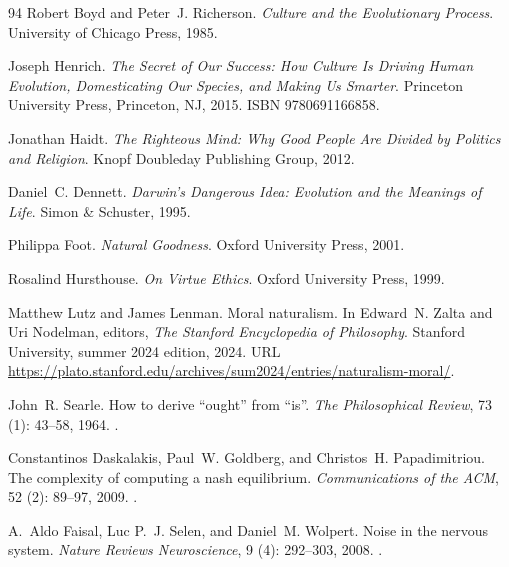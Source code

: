 \documentclass[11pt]{article}
\theoremstyle{plain}
\theoremstyle{definition}
\theoremstyle{remark}
\begin{document}
\begin{thebibliography}{94}
Robert Boyd and Peter~J. Richerson.
\newblock \emph{Culture and the Evolutionary Process}.
\newblock University of Chicago Press, 1985.

Joseph Henrich.
\newblock \emph{The Secret of Our Success: How Culture Is Driving Human
  Evolution, Domesticating Our Species, and Making Us Smarter}.
\newblock Princeton University Press, Princeton, NJ, 2015.
\newblock ISBN 9780691166858.

Jonathan Haidt.
\newblock \emph{The Righteous Mind: Why Good People Are Divided by Politics and
  Religion}.
\newblock Knopf Doubleday Publishing Group, 2012.

Daniel~C. Dennett.
\newblock \emph{Darwin's Dangerous Idea: Evolution and the Meanings of Life}.
\newblock Simon \& Schuster, 1995.

Philippa Foot.
\newblock \emph{Natural Goodness}.
\newblock Oxford University Press, 2001.

Rosalind Hursthouse.
\newblock \emph{On Virtue Ethics}.
\newblock Oxford University Press, 1999.

Matthew Lutz and James Lenman.
\newblock Moral naturalism.
\newblock In Edward~N. Zalta and Uri Nodelman, editors, \emph{The {Stanford}
  Encyclopedia of Philosophy}. Stanford University, summer 2024 edition, 2024.
\newblock URL
  \url{https://plato.stanford.edu/archives/sum2024/entries/naturalism-moral/}.

John~R. Searle.
\newblock How to derive ``ought'' from ``is''.
\newblock \emph{The Philosophical Review}, 73 (1): 43--58,
  1964.
\newblock {}.

Constantinos Daskalakis, Paul~W. Goldberg, and Christos~H. Papadimitriou.
\newblock The complexity of computing a nash equilibrium.
\newblock \emph{Communications of the ACM}, 52 (2): 89--97,
  2009.
\newblock {}.

A.~Aldo Faisal, Luc P.~J. Selen, and Daniel~M. Wolpert.
\newblock Noise in the nervous system.
\newblock \emph{Nature Reviews Neuroscience}, 9 (4):
  292--303, 2008.
\newblock {}.


\end{thebibliography}
\end{document}
